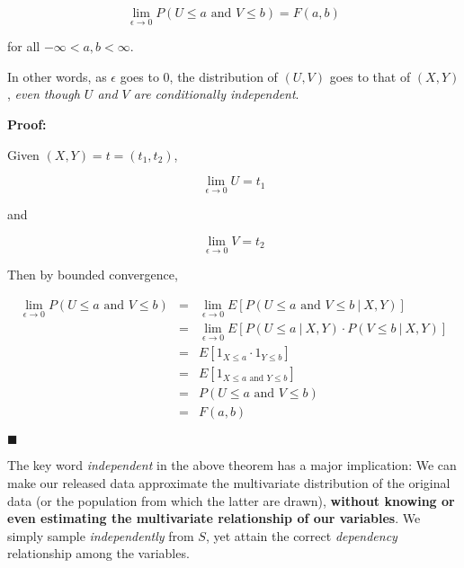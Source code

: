 \documentclass[11pt]{article}
\begin{document}
\begin{equation}
\lim_{\epsilon \rightarrow 0}
P
\left (
U \leq a \textrm{ and } V \leq b
\right )
= F(a,b)
\end{equation}

for all $-\infty < a,b < \infty$.  

In other words, as $\epsilon$ goes to 0, the distribution of $(U,V)$
goes to that of $(X,Y)$, {\it even though $U$ and $V$ are conditionally
independent}.

{\bf Proof:}

Given $(X,Y) = t = (t_1,t_2)$,

\begin{equation}
\lim_{\epsilon \rightarrow 0} U = t_1
\end{equation}

and

\begin{equation}
\lim_{\epsilon \rightarrow 0} V = t_2
\end{equation}


Then by bounded convergence,

\begin{eqnarray}
\lim_{\epsilon \rightarrow 0}
P
\left (
U \leq a \textrm{ and } V \leq b
\right )
&=& 
\lim_{\epsilon \rightarrow 0}
E \left [
P
\left (
U \leq a \textrm{ and } V \leq b
~|~ X,Y \right )
\right ] \\ 
&=& 
\lim_{\epsilon \rightarrow 0}
E \left [
P(U \leq a ~|~ X,Y ) \cdot
P(V \leq b ~|~ X,Y ) 
\right ] \\
&=& E \left [
1_{X \leq a} \cdot
1_{Y \leq b}
\right ] \\
&=& E \left [
1_{X \leq a \textrm{ and } Y \leq b}
\right ] \\
&=& P(U \leq a \textrm{ and } V \leq b) \\
&=& F(a,b)
\end{eqnarray}

$\blacksquare$

\bigskip

The key word {\it independent} in the above theorem has a major
implication:  We can make our released data approximate the multivariate
distribution of the original data (or the population from which the
latter are drawn), {\bf without knowing or even estimating the
multivariate relationship of our variables}.  We simply sample {\it
independently} from $S$, yet attain the correct {\it dependency}
relationship among the variables.

\end{document}

